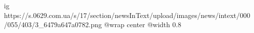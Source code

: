  
 
 
 
 

\ifcmt
  ig https://s.0629.com.ua/s/17/section/newsInText/upload/images/news/intext/000/055/403/3_6479a647a0782.png
  @wrap center
  @width 0.8
\fi
